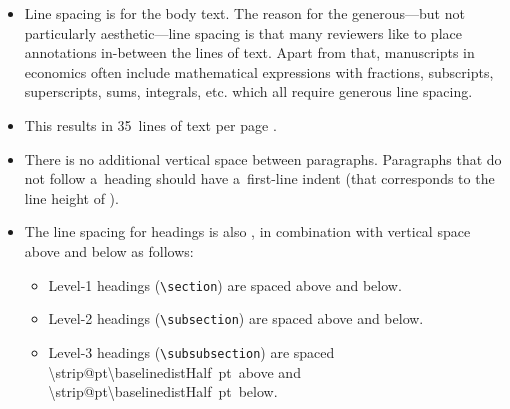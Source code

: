 \documentclass[11pt, a4paper, oneside]{article}
\newlength{\baselinedist}
\theoremstyle{Plain}
\theoremstyle{Definition}
\theoremstyle{Remark}
\begin{document}
\begin{itemize}
	\item Line spacing is \printlength{\baselinedist} for the body text. The reason for the generous---but not particularly aesthetic---line spacing is that many reviewers like to place annotations in-between the lines of text. Apart from that, manuscripts in economics often include mathematical expressions with fractions, subscripts, superscripts, sums, integrals, etc. which all require generous line spacing.
	\item This results in 35~lines of text per page
		\makeatletter%
		\ifdim \f@size pt < 11.5pt%
			(${35 \times 19.5\textup{~pt}} = 682.5\textup{~pt} = 24.08\textup{~cm}$)%
		\else%
			(${35 \times 20.7\textup{~pt}} = 724.5\textup{~pt} = 25.56\textup{~cm}$)%
		\fi%
		\makeatother%
		.
	\item There is no additional vertical space between paragraphs. Paragraphs that do not follow a~heading should have a~first-line indent (that corresponds to the line height of \printlength{\baselinedist}).
	\item The line spacing for headings is also \printlength{\baselinedist}, in combination with vertical space above and below as follows:
		\newlength{\baselinedistDouble}
		\setlength{\baselinedistDouble}{2\baselinedist}
		\newlength{\baselinedistHalf}
		\setlength{\baselinedistHalf}{0.5\baselinedist}
		\begin{itemize}
			\item Level-1 headings (\verb|\section|) are spaced \printlength{\baselinedistDouble} above and \printlength{\baselinedist} below.
			\item Level-2 headings (\verb|\subsection|) are spaced \printlength{\baselinedist} above and \printlength{\baselinedist} below.
			\item Level-3 headings (\verb|\subsubsection|) are spaced \makeatletter\SI[round-mode = places, round-precision = 2]{\strip@pt\baselinedistHalf}{pt}\makeatother\ above and \makeatletter\SI[round-mode = places, round-precision = 2]{\strip@pt\baselinedistHalf}{pt}\makeatother\ below.

\end{itemize}
\end{itemize}
\end{document}
